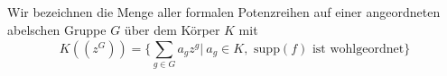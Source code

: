 %
%
%
%
%
%
Wir bezeichnen die Menge aller formalen Potenzreihen auf einer angeordneten abelschen Gruppe $G$ über dem Körper $K$ mit 
\[K\left(\left(z^{G}\right)\right) = \lbrace \sum_{g \in G}^{}a_g z^g |~ a_g \in K, \text{  supp}(f) \text{ ist wohlgeordnet}\rbrace\]
%
%
